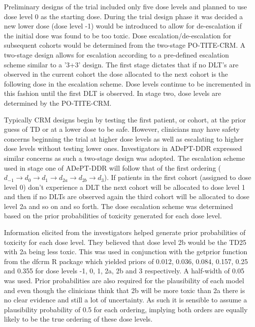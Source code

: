 Preliminary designs of the trial included only five dose levels and planned to use dose level 0 as the starting dose. During the trial design phase it was decided a new lower dose (dose level -1) would be introduced to allow for de-escalation if the initial dose was found to be too toxic. Dose escalation/de-escalation for subsequent cohorts would be determined from the two-stage PO-TITE-CRM. A two-stage design allows for escalation according to a pre-defined escalation scheme similar to a '3+3' design. The first stage dictates that if no DLT's are observed in the current cohort the dose allocated to the next cohort is the following dose in the escalation scheme. Dose levels continue to be incremented in this fashion until the first DLT is observed. In stage two, dose levels are determined by the PO-TITE-CRM.

Typically CRM designs begin by testing the first patient, or cohort, at the prior guess of TD or at a lower dose to be safe. However, clinicians may have safety concerns beginning the trial at higher dose levels as well as escalating to higher dose levels without testing lower ones. Investigators in ADePT-DDR expressed similar concerns as such a two-stage design was adopted. The escalation scheme used in stage one of ADePT-DDR will follow that of the first ordering ($d_{-1} \rightarrow d_{0} \rightarrow d_{1} \rightarrow d_{2a} \rightarrow d_{2b} \rightarrow d_{3}$). If patients in the first cohort (assigned to dose level 0) don't experience a DLT the next cohort will be allocated to dose level 1 and then if no DLTs are observed again the third cohort will be allocated to dose level 2a and so on and so forth. The dose escalation scheme was determined based on the prior probabilities of toxicity generated for each dose level.  

Information elicited from the investigators helped generate prior probabilities of toxicity for each dose level. They believed that dose level 2b would be the TD25 with 2a being less toxic. This was used in conjunction with the getprior function from the dfcrm R package \cite{cheungDfcrmDoseFindingContinual2019} which yielded priors of 0.012, 0.036, 0.084, 0.157, 0.25 and 0.355 for dose levels -1, 0, 1, 2a, 2b and 3 respectively. A half-width of 0.05 was used. Prior probabilities are also required for the plausibility of each model and even though the clinicians think that 2b will be more toxic than 2a there is no clear evidence and still a lot of uncertainty. As such it is sensible to assume a plausibility probability of 0.5 for each ordering, implying both orders are equally likely to be the true ordering of these dose levels. 

